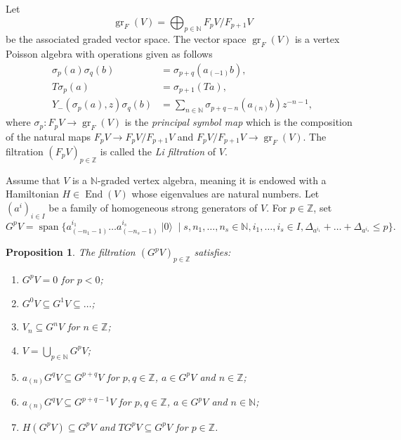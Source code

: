 \documentclass[a4paper, 12pt, reqno]{amsart}
\newtheorem{proposition}[theorem]{Proposition}
\theoremstyle{remark}
\DeclareMathOperator{\gr}{gr}
\DeclareMathOperator{\End}{End}
\DeclareMathOperator{\vspan}{span}
\DeclareMathOperator{\vac}{|0\rangle}
\begin{document}
Let
\begin{equation*}
  \gr_F(V) = \bigoplus_{p \in \mathbb{N}}F_pV/F_{p + 1}V
\end{equation*}
be the associated graded vector space.
The vector space $\gr_F(V)$ is a vertex Poisson algebra with operations given as follows
\begin{align*}
  \sigma_p(a)\sigma_q(b) &= \sigma_{p + q}(a_{(-1)}b), \\
  T\sigma_p(a) &= \sigma_{p + 1}(Ta), \\
  Y_-(\sigma_p(a),z)\sigma_q(b) &= \sum_{n \in \mathbb{N}}\sigma_{p + q - n}(a_{(n)}b)z^{-n - 1},
\end{align*}
where $\sigma_p: F_pV \to \gr_F(V)$ is the \emph{principal symbol map} which is the composition of the natural maps $F_pV \to F_pV/F_{p + 1}V$ and $F_pV/F_{p+1}V \to \gr_F(V)$.
The filtration $(F_pV)_{p \in \mathbb{Z}}$ is called the \emph{Li filtration} of $V$.

Assume that $V$ is a $\mathbb{N}$-graded vertex algebra, meaning it is endowed with a Hamiltonian $H \in \End(V)$ whose eigenvalues are natural numbers.
Let $(a^i)_{i \in I}$ be a family of homogeneous strong generators of $V$.
For $p \in \mathbb{Z}$, set
\begin{equation*}
  G^pV = \vspan\{a^{i_1}_{(-n_1 - 1)}\dots a^{i_s}_{(-n_s - 1)}\vac \mid s, n_1, \dots, n_s \in \mathbb{N}, i_1, \dots, i_s \in I, \Delta_{a^{i_1}} + \dots + \Delta_{a^{i_s}} \le p\}.
\end{equation*}

\begin{proposition}
  \label{prp:2}
  The filtration $(G^pV)_{p \in \mathbb{Z}}$ satisfies:
  \begin{enumerate}
  \item $G^pV = 0$ for $p < 0$;
  \item $G^0V \subseteq G^1V \subseteq \dots$;
  \item $V_n \subseteq G^nV$ for $n \in \mathbb{Z}$;
  \item $V = \bigcup_{p \in \mathbb{N}}G^pV$;
  \item $a_{(n)}G^qV \subseteq G^{p + q}V$ for $p, q \in \mathbb{Z}$, $a \in G^pV$ and $n \in \mathbb{Z}$;
  \item $a_{(n)}G^qV \subseteq G^{p + q - 1}V$ for $p, q \in \mathbb{Z}$, $a \in G^pV$ and $n \in \mathbb{N}$;
  \item $H(G^pV) \subseteq G^pV$ and $TG^pV \subseteq G^pV$ for $p \in \mathbb{Z}$.
  \end{enumerate}
\end{proposition}
\end{document}
